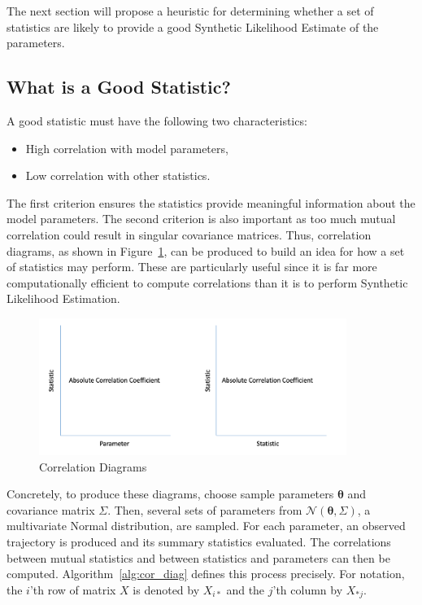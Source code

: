 The next section will propose a heuristic for determining whether a set of statistics are likely to provide a good Synthetic Likelihood Estimate of the parameters.

\subsection{What is a Good Statistic?}
\label{subsec:corr_diag}

A good statistic must have the following two characteristics:

\begin{itemize}
    \item High correlation with model parameters,
    \item Low correlation with other statistics.
\end{itemize}

The first criterion ensures the statistics provide meaningful information about the model parameters. The second criterion is also important as too much mutual correlation could result in singular covariance matrices. Thus, correlation diagrams, as shown in Figure~\ref{fig:corr_diags}, can be produced to build an idea for how a set of statistics may perform. These are particularly useful since it is far more computationally efficient to compute correlations than it is to perform Synthetic Likelihood Estimation.

\begin{figure}[H]
    \centering
    \includegraphics[width=10cm]{images/sl/corr_diags.png}
    \caption{Correlation Diagrams}
    \label{fig:corr_diags}
\end{figure}

Concretely, to produce these diagrams, choose sample parameters $\pmb{\theta}$ and covariance matrix $\Sigma$. Then, several sets of parameters from $\mathcal{N}(\pmb{\theta}, \Sigma)$, a multivariate Normal distribution, are sampled. For each parameter, an observed trajectory is produced and its summary statistics evaluated. The correlations between mutual statistics and between statistics and parameters can then be computed. Algorithm~\ref{alg:cor_diag} defines this process precisely. For notation, the $i$'th row of matrix $X$ is denoted by $X_{i*}$ and the $j$'th column by $X_{*j}$.

